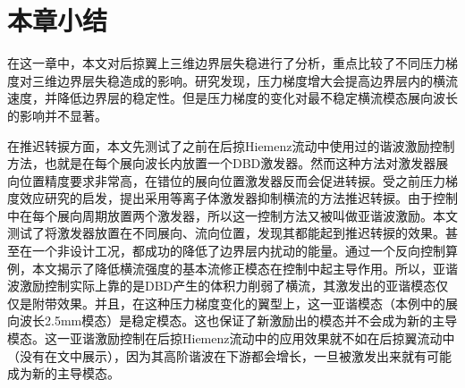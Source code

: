 \section{本章小结}
在这一章中，本文对后掠翼上三维边界层失稳进行了分析，重点比较了不同压力梯度对三维边界层失稳造成的影响。研究发现，压力梯度增大会提高边界层内的横流速度，并降低边界层的稳定性。但是压力梯度的变化对最不稳定横流模态展向波长的影响并不显著。

在推迟转捩方面，本文先测试了之前在后掠Hiemenz流动中使用过的谐波激励控制方法，也就是在每个展向波长内放置一个DBD激发器。然而这种方法对激发器展向位置精度要求非常高，在错位的展向位置激发器反而会促进转捩。受之前压力梯度效应研究的启发，提出采用等离子体激发器抑制横流的方法推迟转捩。由于控制中在每个展向周期放置两个激发器，所以这一控制方法又被叫做亚谐波激励。本文测试了将激发器放置在不同展向、流向位置，发现其都能起到推迟转捩的效果。甚至在一个非设计工况，都成功的降低了边界层内扰动的能量。通过一个反向控制算例，本文揭示了降低横流强度的基本流修正模态在控制中起主导作用。所以，亚谐波激励控制实际上靠的是DBD产生的体积力削弱了横流，其激发出的亚谐模态仅仅是附带效果。并且，在这种压力梯度变化的翼型上，这一亚谐模态（本例中的展向波长2.5mm模态）是稳定模态。这也保证了新激励出的模态并不会成为新的主导模态。这一亚谐激励控制在后掠Hiemenz流动中的应用效果就不如在后掠翼流动中（没有在文中展示），因为其高阶谐波在下游都会增长，一旦被激发出来就有可能成为新的主导模态。
